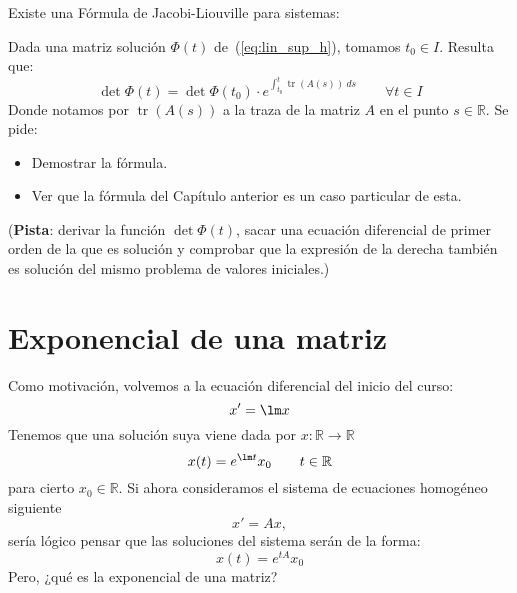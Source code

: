 \begin{ejercicio*}
    Existe una Fórmula de Jacobi-Liouville para sistemas:

    Dada una matriz solución $\Phi(t)$ de~(\ref{eq:lin_sup_h}), tomamos $t_0\in I$. Resulta que:
    \begin{equation*}
        \det\Phi(t) = \det\Phi(t_0)\cdot e^{\displaystyle \int_{t_0}^{t} \operatorname{tr} (A(s))~ds } \qquad \forall t\in I
    \end{equation*}
    Donde notamos por $\operatorname{tr}(A(s))$ a la traza de la matriz $A$ en el punto $s\in \mathbb{R}$. Se pide:
    \begin{itemize}
        \item Demostrar la fórmula.
        \item Ver que la fórmula del Capítulo anterior es un caso particular de esta.
    \end{itemize}
    (\textbf{Pista}: derivar la función $\det\Phi(t)$, sacar una ecuación diferencial de primer orden de la que es solución y comprobar que la expresión de la derecha también es solución del mismo problema de valores iniciales.)
\end{ejercicio*}

\section{Exponencial de una matriz}
\noindent
Como motivación, volvemos a la ecuación diferencial del inicio del curso:
\begin{equation*}
    x' = \lm x
\end{equation*}
Tenemos que una solución suya viene dada por $x:\mathbb{R}\rightarrow\mathbb{R}$
\begin{equation*}
    x(t) = e^{\lm t} x_0 \qquad t\in \mathbb{R}
\end{equation*}
para cierto $x_0\in \mathbb{R}$. Si ahora consideramos el sistema de ecuaciones homogéneo siguiente
\begin{equation*}
    x' = Ax,
\end{equation*}
sería lógico pensar que las soluciones del sistema serán de la forma:
\begin{equation*}
    x(t) = e^{tA} x_0
\end{equation*}
Pero, ¿qué es la exponencial de una matriz?


